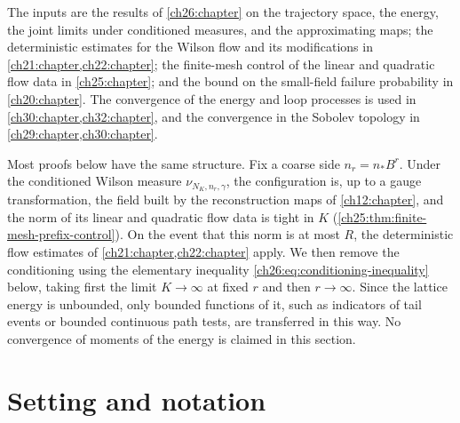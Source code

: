 The inputs are the results of \cref{ch26:chapter} on the trajectory space, the energy, the joint limits under conditioned measures, and the approximating maps; the deterministic estimates for the Wilson flow and its modifications in \cref{ch21:chapter,ch22:chapter}; the finite-mesh control of the linear and quadratic flow data in \cref{ch25:chapter}; and the bound on the small-field failure probability in \cref{ch20:chapter}. The convergence of the energy and loop processes is used in \cref{ch30:chapter,ch32:chapter}, and the convergence in the Sobolev topology in \cref{ch29:chapter,ch30:chapter}.

Most proofs below have the same structure. Fix a coarse side $n_r=n_*B^r$. Under the conditioned Wilson measure $\nu_{N_K,n_r,\gamma}$, the configuration is, up to a gauge transformation, the field built by the reconstruction maps of \cref{ch12:chapter}, and the norm of its linear and quadratic flow data is tight in $K$ (\cref{ch25:thm:finite-mesh-prefix-control}). On the event that this norm is at most $R$, the deterministic flow estimates of \cref{ch21:chapter,ch22:chapter} apply. We then remove the conditioning using the elementary inequality \eqref{ch26:eq:conditioning-inequality} below, taking first the limit $K\to\infty$ at fixed $r$ and then $r\to\infty$. Since the lattice energy is unbounded, only bounded functions of it, such as indicators of tail events or bounded continuous path tests, are transferred in this way. No convergence of moments of the energy is claimed in this section.

\section{Setting and notation}\label{ch26:sec:properties-setting}

